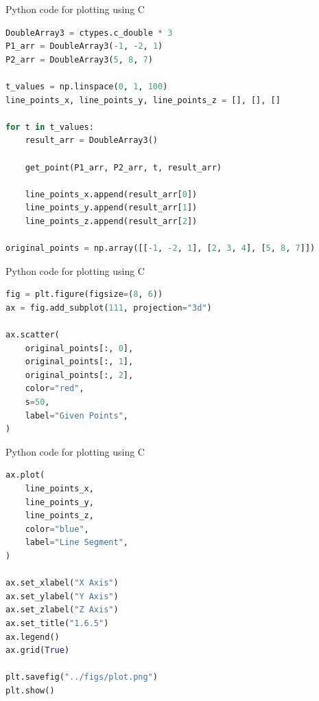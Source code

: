 \documentclass{beamer}
\theoremstyle{remark}
\numberwithin{equation}{section}
\begin{document}
\begin{frame}[fragile]{Python code for plotting using C}
\begin{lstlisting}[language=Python]
DoubleArray3 = ctypes.c_double * 3
P1_arr = DoubleArray3(-1, -2, 1)
P2_arr = DoubleArray3(5, 8, 7)

t_values = np.linspace(0, 1, 100)
line_points_x, line_points_y, line_points_z = [], [], []

for t in t_values:
    result_arr = DoubleArray3()

    get_point(P1_arr, P2_arr, t, result_arr)

    line_points_x.append(result_arr[0])
    line_points_y.append(result_arr[1])
    line_points_z.append(result_arr[2])

original_points = np.array([[-1, -2, 1], [2, 3, 4], [5, 8, 7]])

\end{lstlisting}
\end{frame}

\begin{frame}[fragile]{Python code for plotting using C}
\begin{lstlisting}[language=Python]
fig = plt.figure(figsize=(8, 6))
ax = fig.add_subplot(111, projection="3d")

ax.scatter(
    original_points[:, 0],
    original_points[:, 1],
    original_points[:, 2],
    color="red",
    s=50,
    label="Given Points",
)

\end{lstlisting}
\end{frame}

\begin{frame}[fragile]{Python code for plotting using C}
\begin{lstlisting}[language=Python]
ax.plot(
    line_points_x,
    line_points_y,
    line_points_z,
    color="blue",
    label="Line Segment",
)

ax.set_xlabel("X Axis")
ax.set_ylabel("Y Axis")
ax.set_zlabel("Z Axis")
ax.set_title("1.6.5")
ax.legend()
ax.grid(True)

plt.savefig("../figs/plot.png")
plt.show()
\end{lstlisting}
\end{frame}
\end{document}

